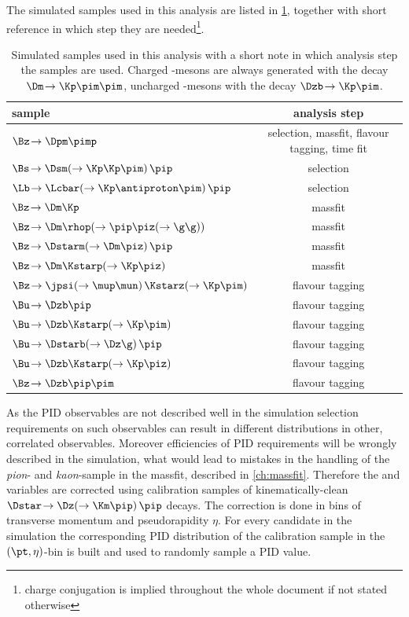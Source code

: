 The simulated samples used in this analysis are listed in \cref{tab:simSamples}, together with short reference in which step they are needed\footnote{charge conjugation is implied throughout the whole document if not stated otherwise}.
\begin{table}[tbp]
	\centering
	\caption{Simulated samples used in this analysis with a short note in which analysis step the samples are used.
	Charged \D-mesons are always generated with the decay $\Dm\!\to\Kp\pim\pim$, uncharged \D-mesons with the decay $\Dzb\!\to\Kp\pim$.}
	\begin{tabular}{lc}
		\toprule
		sample & analysis step \\
		\midrule
		$\Bz\!\to\Dpm\pimp$ 														& selection, massfit, flavour tagging, time fit \\
		$\Bs\!\to\Dsm\!\left(\to\Kp\Kp\pim\right)\pip$  							& selection \\
		$\Lb\!\to\Lcbar\!\left(\to\Kp\antiproton\pim\right)\pip$ 					& selection \\
		$\Bz\!\to\Dm\Kp$ 															& massfit \\
		$\Bz\!\to\Dm\rhop\!\left(\to\pip\piz\!\left(\to\g\g\right)\right)$ 			& massfit \\
		$\Bz\!\to\Dstarm\!\left(\to\Dm\piz\right)\pip$ 								& massfit \\
		$\Bz\!\to\Dm\Kstarp\!\left(\to\Kp\piz\right)$ 								& massfit \\
		$\Bz\!\to\jpsi\!\left(\to\mup\mun\right)\Kstarz\!\left(\to\Kp\pim\right)$ 	& flavour tagging \\
		$\Bu\!\to\Dzb\pip$ 															& flavour tagging \\
		$\Bu\!\to\Dzb\Kstarp\!\left(\to\Kp\pim\right)$ 								& flavour tagging \\
		$\Bu\!\to\Dstarb\!\left(\to\Dz\g\right)\pip$ 								& flavour tagging \\
		$\Bu\!\to\Dzb\Kstarp\!\left(\to\Kp\piz\right)$ 								& flavour tagging \\
		$\Bz\!\to\Dzb\pip\pim$ 														& flavour tagging \\
		\bottomrule
	\end{tabular}
	\label{tab:simSamples}
\end{table}
As the PID observables are not described well in the simulation selection requirements on such observables can result in different distributions in other, correlated observables.
Moreover efficiencies of PID requirements will be wrongly described in the simulation, what would lead to mistakes in the handling of the \emph{pion}- and \emph{kaon}-sample in the massfit, described in \cref{ch:massfit}.
Therefore the \dllkpi and \dllppi variables are corrected using calibration samples of kinematically-clean $\Dstar\!\to\Dz\!\left(\to\Km\pip\right)\pip$ decays.
The correction is done in bins of transverse momentum \pt and pseudorapidity $\eta$.
For every candidate in the simulation the corresponding PID distribution of the calibration sample in the $(\pt,\eta)$-bin is built and used to randomly sample a PID value.

